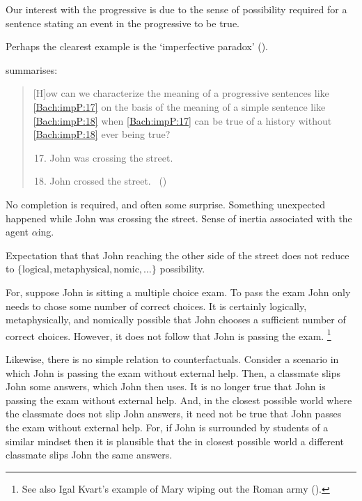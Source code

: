 \begin{note}
  Our interest with the progressive is due to the sense of possibility required for a sentence stating an event in the progressive to be true.

  Perhaps the clearest example is the `imperfective paradox' (\citeyear[cf.][Ch.3.1]{Dowty:1979vq}).

  \citeauthor{Bach:1986tb} summarises:
  \begin{quote}
    [H]ow can we characterize the meaning of a progressive sentences like \ref{Bach:impP:17} on the basis of the meaning of a simple sentence like \ref{Bach:impP:18} when \ref{Bach:impP:17} can be true of a history without \ref{Bach:impP:18} ever being true?
    \begin{enumerate}[label=(\arabic*), ref=(\arabic*)]
      \setcounter{enumi}{16}
    \item
      \label{Bach:impP:17}
      John was crossing the street.
    \item
      \label{Bach:impP:18}
      John crossed the street.%
      \mbox{ }\hfill\mbox{(\citeyear[12]{Bach:1986tb})}
    \end{enumerate}
  \end{quote}

  No completion is required, and often some surprise.
  Something unexpected happened while John was crossing the street.
  Sense of inertia associated with the agent \(\alpha\)ing.

  Expectation that that John reaching the other side of the street does not reduce to \(\{\text{logical}, \text{metaphysical}, \text{nomic}, \dots\}\) possibility.

  For, suppose John is sitting a multiple choice exam.
  To pass the exam John only needs to chose some number of correct choices.
  It is certainly logically, metaphysically, and nomically possible that John chooses a sufficient number of correct choices.
  However, it does not follow that John is passing the exam.%
  \footnote{
    See also Igal Kvart's example of Mary wiping out the Roman army (\cite[18]{Landman:1992wh}).
  }

  Likewise, there is no simple relation to counterfactuals.
  Consider a scenario in which John is passing the exam without external help.
  Then, a classmate slips John some answers, which John then uses.
  It is no longer true that John is passing the exam without external help.
  And, in the closest possible world where the classmate does not slip John answers, it need not be true that John passes the exam without external help.
  For, if John is surrounded by students of a similar mindset then it is plausible that the in closest possible world a different classmate slips John the same answers.
\end{note}

